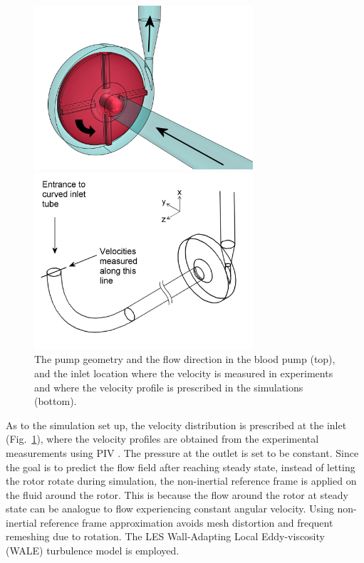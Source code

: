 \begin{figure}[htbp]
    \centering
    \begin{minipage}[c][2.5in][c]{0.9\linewidth}
        \centering
        \includegraphics[width=3.2in]{imgs/nozzle_pump/housing_and_rotor.png}
    \end{minipage}
    \begin{minipage}[c][2.5in][c]{0.9\linewidth}
        \centering
        \includegraphics[width=3.2in]{imgs/nozzle_pump/inlet_velcocity_profile_location.png}
    \end{minipage}
    \caption{The pump geometry and the flow direction in the blood pump (top), and the inlet location where the velocity is measured in experiments and where the velocity profile is prescribed in the simulations (bottom).}
    \label{fig:pumpgeo}
\end{figure}

As to the simulation set up, the velocity distribution is prescribed at the inlet (Fig.~\ref{fig:pumpgeo}), where the velocity profiles are obtained from the experimental measurements using PIV \cite{cpi}. The pressure at the outlet is set to be constant. Since the goal is to predict the flow field after reaching steady state, instead of letting the rotor rotate during simulation, the non-inertial reference frame is applied on the fluid around the rotor. This is because the flow around the rotor at steady state can be analogue to flow experiencing constant angular velocity. Using non-inertial reference frame approximation avoids mesh distortion and frequent remeshing due to rotation. The LES Wall-Adapting Local Eddy-viscosity (WALE) turbulence model is employed. 


